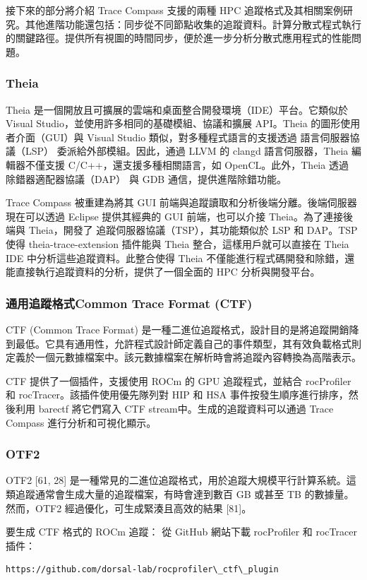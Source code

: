 接下來的部分將介紹 Trace Compass 支援的兩種 HPC 追蹤格式及其相關案例研究。其他進階功能還包括：同步從不同節點收集的追蹤資料。計算分散式程式執行的關鍵路徑。提供所有視圖的時間同步，便於進一步分析分散式應用程式的性能問題。

\subsubsection{Theia}
Theia 是一個開放且可擴展的雲端和桌面整合開發環境（IDE）平台。它類似於 Visual Studio，並使用許多相同的基礎模組、協議和擴展 API。Theia 的圖形使用者介面（GUI）與 Visual Studio 類似，對多種程式語言的支援透過 語言伺服器協議（LSP） 委派給外部模組。因此，通過 LLVM 的 clangd 語言伺服器，Theia 編輯器不僅支援 C/C++，還支援多種相關語言，如 OpenCL。此外，Theia 透過 除錯器適配器協議（DAP） 與 GDB 通信，提供進階除錯功能。

Trace Compass 被重建為將其 GUI 前端與追蹤讀取和分析後端分離。後端伺服器現在可以透過 Eclipse 提供其經典的 GUI 前端，也可以介接 Theia。為了連接後端與 Theia，開發了 追蹤伺服器協議（TSP），其功能類似於 LSP 和 DAP。TSP 使得 theia-trace-extension 插件能與 Theia 整合，這樣用戶就可以直接在 Theia IDE 中分析這些追蹤資料。此整合使得 Theia 不僅能進行程式碼開發和除錯，還能直接執行追蹤資料的分析，提供了一個全面的 HPC 分析與開發平台。

\subsubsection{通用追蹤格式Common Trace Format (CTF)}
CTF (Common Trace Format) 是一種二進位追蹤格式，設計目的是將追蹤開銷降到最低。它具有通用性，允許程式設計師定義自己的事件類型，其有效負載格式則定義於一個元數據檔案中。該元數據檔案在解析時會將追蹤內容轉換為高階表示。

CTF 提供了一個插件，支援使用 ROCm 的 GPU 追蹤程式，並結合 rocProfiler 和 rocTracer。該插件使用優先隊列對 HIP 和 HSA 事件按發生順序進行排序，然後利用 barectf 將它們寫入 CTF stream中。生成的追蹤資料可以通過 Trace Compass 進行分析和可視化顯示。

\subsubsection{OTF2}
OTF2 [61, 28] 是一種常見的二進位追蹤格式，用於追蹤大規模平行計算系統。這類追蹤通常會生成大量的追蹤檔案，有時會達到數百 GB 或甚至 TB 的數據量。然而，OTF2 經過優化，可生成緊湊且高效的結果 [81]。

要生成 CTF 格式的 ROCm 追蹤：
從 GitHub 網站下載 rocProfiler 和 rocTracer 插件：
\begin{lstlisting}
https://github.com/dorsal-lab/rocprofiler\_ctf\_plugin
\end{lstlisting}

